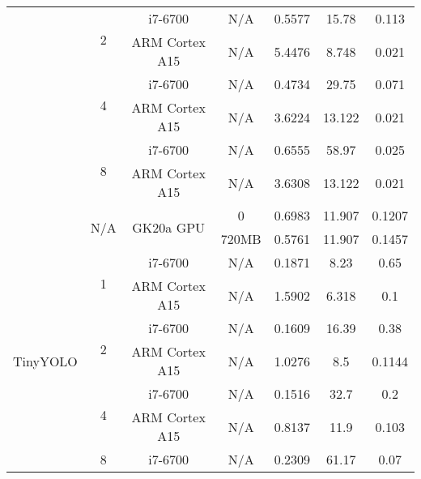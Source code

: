 \begin{table}[H]
\begin{center}
\begin{tabular}[center]{ | c | c | c | c | c | c | c | }
                                  & \multirow{2}{*}{2}    & i7-6700                     & N/A     & 0.5577  & 15.78   & 0.113   \\ \cline{3-7}
                                  &                       & ARM Cortex A15              & N/A     & 5.4476  & 8.748   & 0.021   \\ \cline{2-7}
                                  & \multirow{2}{*}{4}    & i7-6700                     & N/A     & 0.4734  & 29.75   & 0.071   \\ \cline{3-7}
                                  &                       & ARM Cortex A15              & N/A     & 3.6224  & 13.122  & 0.021   \\ \cline{2-7}
                                  & \multirow{2}{*}{8}    & i7-6700                     & N/A     & 0.6555  & 58.97   & 0.025   \\ \cline{3-7}
                                  &                       & ARM Cortex A15              & N/A     & 3.6308  & 13.122  & 0.021   \\ \cline{2-7}
                                  & \multirow{2}{*}{N/A}  & \multirow{2}{*}{GK20a GPU}  & 0       & 0.6983  & 11.907  & 0.1207  \\ \cline{4-7}
                                  &                       &                             & 720MB   & 0.5761  & 11.907  & 0.1457  \\ \hline
      \multirow{10}{*}{TinyYOLO}  & \multirow{2}{*}{1}    & i7-6700                     & N/A     & 0.1871  & 8.23    & 0.65    \\ \cline{3-7}
                                  &                       & ARM Cortex A15              & N/A     & 1.5902  & 6.318   & 0.1     \\ \cline{2-7}
                                  & \multirow{2}{*}{2}    & i7-6700                     & N/A     & 0.1609  & 16.39   & 0.38    \\ \cline{3-7}
                                  &                       & ARM Cortex A15              & N/A     & 1.0276  & 8.5     & 0.1144  \\ \cline{2-7}
                                  & \multirow{2}{*}{4}    & i7-6700                     & N/A     & 0.1516  & 32.7    & 0.2     \\ \cline{3-7}
                                  &                       & ARM Cortex A15              & N/A     & 0.8137  & 11.9    & 0.103   \\ \cline{2-7}
                                  & \multirow{2}{*}{8}    & i7-6700                     & N/A     & 0.2309  & 61.17   & 0.07    \\ \cline{3-7}

\end{tabular}
\end{center}
\end{table}
